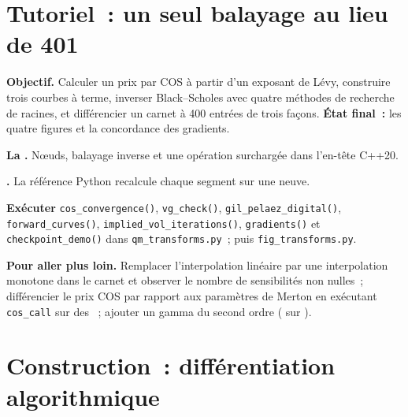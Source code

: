 \section{Tutoriel~: un seul balayage au lieu de 401}\label{tut:qm:transforms-interpolation-and-algorithmic-differentiation:aad}

\begin{tutorial}
\textbf{Objectif.} Calculer un prix par COS à partir d'un exposant de Lévy, construire trois courbes à terme, inverser Black--Scholes avec quatre méthodes de recherche de racines, et différencier un carnet à 400 entrées de trois façons. \textbf{État final~:} les quatre figures
et la concordance des gradients.
\begin{tutsteps}
\item \textbf{La .} Nœuds, balayage inverse et une opération surchargée dans l'en-tête C++20.
\item \textbf{.} La référence Python recalcule chaque segment sur une  neuve.
\item \textbf{Exécuter} \texttt{cos\_convergence()}, \texttt{vg\_check()}, \texttt{gil\_pelaez\_digital()}, \texttt{forward\_curves()}, \texttt{implied\_vol\_iterations()}, \texttt{gradients()} et
\texttt{checkpoint\_demo()} dans \texttt{qm\_transforms.py}~; puis \texttt{fig\_transforms.py}.
\end{tutsteps}
\textbf{Pour aller plus loin.} Remplacer l'interpolation linéaire par une interpolation monotone dans le carnet et observer le nombre de sensibilités non nulles~; différencier le prix COS par rapport aux paramètres de Merton en
exécutant \texttt{cos\_call} sur des ~; ajouter un gamma du second ordre ( sur ).
\end{tutorial}

\section{Construction~: différentiation algorithmique}\label{bld:qm:transforms-interpolation-and-algorithmic-differentiation:aad}

